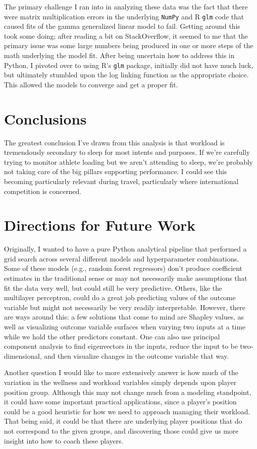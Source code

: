 \documentclass{article}
\begin{document}
		The primary challenge I ran into in analyzing these data was the fact that
		there were matrix multiplication errors in the underlying \texttt{NumPy}
		and R \texttt{glm} code that caused fits of the gamma generalized linear model
		to fail. Getting around this took some doing; after reading a bit on
		StackOverflow, it seemed to me that the primary issue was some large numbers
		being produced in one or more steps of the math underlying the model fit.
		After being uncertain how to address this in Python, I pivoted over to using
		R's \texttt{glm} package, initially did not have much luck, but ultimately
		stumbled upon the log linking function as the appropriate choice. This
		allowed the models to converge and get a proper fit.

	\section{Conclusions}

		The greatest conclusion I've drawn from this analysis is that workload is
		tremendously secondary to sleep for most intents and purposes. If we're
		carefully trying to monitor athlete loading but we aren't attending to
		sleep, we're probably not taking care of the big pillars supporting
		performance. I could see this becoming particularly relevant during
		travel, particularly where international competition is concerned.

	\section{Directions for Future Work}

		Originally, I wanted to have a pure Python analytical pipeline that performed
		a grid search across several different models and hyperparameter combinations.
		Some of these models (e.g., random forest regressors) don't produce coefficient
		estimates in the traditional sense or may not necessarily make assumptions that
		fit the data very well, but could still be very predictive. Others, like the
		multilayer perceptron, could do a great job predicting values of the
		outcome variable but might not necessarily be very readily interpretable.
		However, there are ways around this: a few solutions that come to mind are
		Shapley values, as well as visualizing outcome variable surfaces when varying
		two inputs at a time while we hold the other predictors constant. One can
		also use principal component analysis to find eigenvectors in the inputs,
		reduce the input to be two-dimensional, and then visualize changes in the
		outcome variable that way.

		Another question I would like to more extensively answer is how much of
		the variation in the wellness and workload variables simply depends upon
		player position group. Although this may not change much from a modeling
		standpoint, it could have some important practical applications, since a
		player's position could be a good heuristic for how we need to approach
		managing their workload. That being said, it could be that there are
		underlying player positions that do not correspond to the given groups,
		and discovering those could give us more insight into how to coach these
		players.
\end{document}
